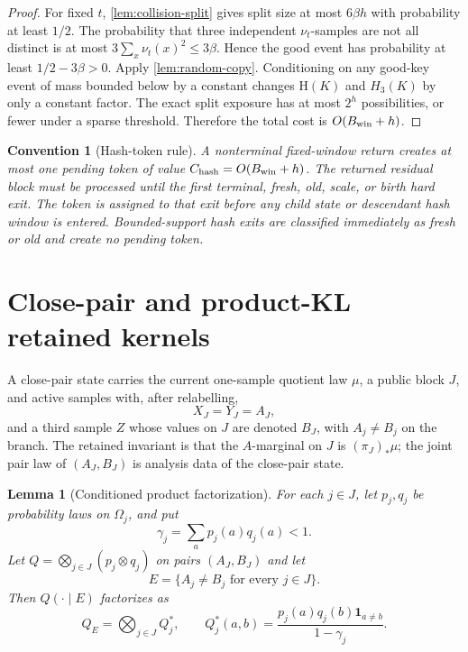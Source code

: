 \documentclass[11pt]{article}
\newcommand{\Cref}[1]{\ref{#1}}
\newtheorem{lemma}[theorem]{Lemma}
\newtheorem{convention}[theorem]{Convention}
\theoremstyle{remark}
\newcommand{\HH}{\mathrm H}
\begin{document}
\begin{proof}
For fixed $t$, \Cref{lem:collision-split} gives split size at most $6\beta h$ with probability at least $1/2$.  The probability that three independent $\nu_t$-samples are not all distinct is at most $3\sum_x\nu_t(x)^2\le3\beta$.  Hence the good event has probability at least $1/2-3\beta>0$.  Apply \Cref{lem:random-copy}.  Conditioning on any good-key event of mass bounded below by a constant changes $\HH(K)$ and $H_3(K)$ by only a constant factor.  The exact split exposure has at most $2^h$ possibilities, or fewer under a sparse threshold.  Therefore the total cost is $O(B_{\rm win}+h)$.
\end{proof}

\begin{convention}[Hash-token rule]\label{conv:hash-token}
A nonterminal fixed-window return creates at most one pending token of value $C_{\rm hash}=O(B_{\rm win}+h)$.  The returned residual block must be processed until the first terminal, fresh, old, scale, or birth hard exit.  The token is assigned to that exit before any child state or descendant hash window is entered.  Bounded-support hash exits are classified immediately as fresh or old and create no pending token.
\end{convention}


\section{Close-pair and product-KL retained kernels}\label{sec:close-pair}

A close-pair state carries the current one-sample quotient law $\mu$, a public
block $J$, and active samples with, after relabelling,
\[
        X_J=Y_J=A_J,
\tag{*}
\]
and a third sample $Z$ whose values on $J$ are denoted $B_J$, with $A_j\ne B_j$ on the branch.
The retained invariant is that the $A$-marginal on $J$ is $(\pi_J)_*\mu$; the
joint pair law of $(A_J,B_J)$ is analysis data of the close-pair state.

\begin{lemma}[Conditioned product factorization]\label{lem:conditioned-product}
For each $j\in J$, let $p_j,q_j$ be probability laws on $\Omega_j$, and put
\[
        \gamma_j=\sum_a p_j(a)q_j(a)<1.
\]
Let $Q=\bigotimes_{j\in J}(p_j\otimes q_j)$ on pairs $(A_J,B_J)$ and let
\[
        E=\{A_j\ne B_j\text{ for every }j\in J\}.
\]
Then $Q(\cdot\mid E)$ factorizes as
\[
        Q_E=\bigotimes_{j\in J} Q_j^*,
        \qquad
        Q_j^*(a,b)= \frac{p_j(a)q_j(b)\mathbf 1_{a\ne b}}{1-\gamma_j}.
\]
\end{lemma}
\end{document}

